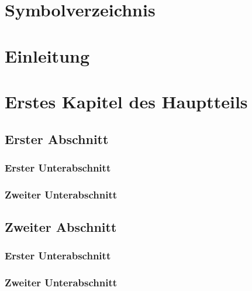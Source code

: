 ﻿\documentclass[a4paper,titlepage]{article}
\numberwithin{equation}{section} %
\begin{document}
\section*{Symbolverzeichnis}
\newpage


\setcounter{page}{1}
\section{Einleitung}
\newpage



\section{Erstes Kapitel des Hauptteils}


\subsection{Erster Abschnitt}

\subsubsection{Erster Unterabschnitt}

\subsubsection{Zweiter Unterabschnitt}

 
\subsection{Zweiter Abschnitt}

\subsubsection{Erster Unterabschnitt}

\subsubsection{Zweiter Unterabschnitt}
\end{document}
